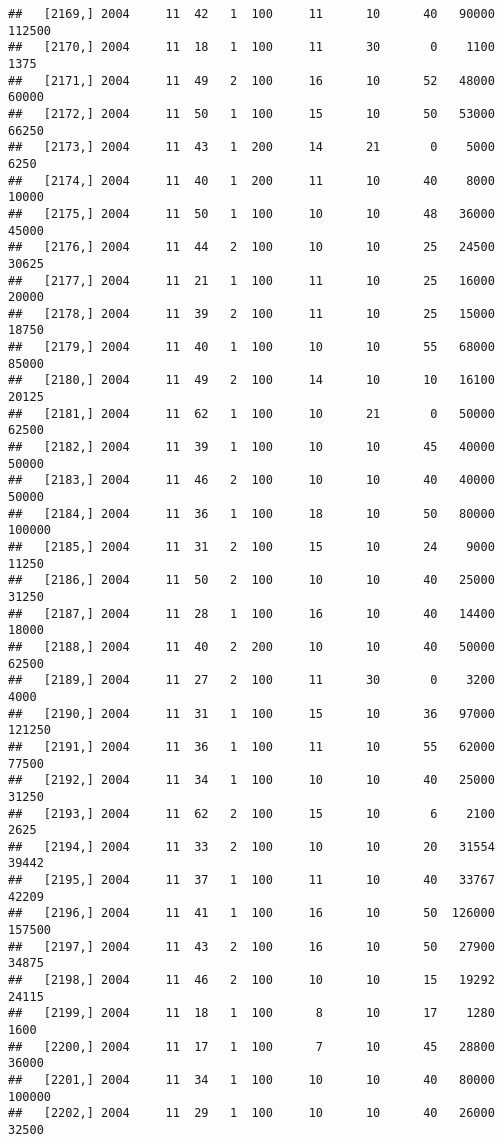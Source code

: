 \documentclass{article}\usepackage[]{graphicx}\usepackage[]{color}
\makeatletter
\newenvironment{kframe}{%
 \def\at@end@of@kframe{}%
 \ifinner\ifhmode%
  \def\at@end@of@kframe{\end{minipage}}%
  \begin{minipage}{\columnwidth}%
 \fi\fi%
 \def\FrameCommand##1{\hskip\@totalleftmargin \hskip-\fboxsep
 \colorbox{shadecolor}{##1}\hskip-\fboxsep
     \hskip-\linewidth \hskip-\@totalleftmargin \hskip\columnwidth}%
 \MakeFramed {\advance\hsize-\width
   \@totalleftmargin\z@ \linewidth\hsize
   \@setminipage}}%
 {\par\unskip\endMakeFramed%
 \at@end@of@kframe}
\newenvironment{knitrout}{}{} %
\makeatother
\begin{document}
\begin{knitrout}
\begin{kframe}
\begin{verbatim}
##   [2169,] 2004     11  42   1  100     11      10      40   90000  112500
##   [2170,] 2004     11  18   1  100     11      30       0    1100    1375
##   [2171,] 2004     11  49   2  100     16      10      52   48000   60000
##   [2172,] 2004     11  50   1  100     15      10      50   53000   66250
##   [2173,] 2004     11  43   1  200     14      21       0    5000    6250
##   [2174,] 2004     11  40   1  200     11      10      40    8000   10000
##   [2175,] 2004     11  50   1  100     10      10      48   36000   45000
##   [2176,] 2004     11  44   2  100     10      10      25   24500   30625
##   [2177,] 2004     11  21   1  100     11      10      25   16000   20000
##   [2178,] 2004     11  39   2  100     11      10      25   15000   18750
##   [2179,] 2004     11  40   1  100     10      10      55   68000   85000
##   [2180,] 2004     11  49   2  100     14      10      10   16100   20125
##   [2181,] 2004     11  62   1  100     10      21       0   50000   62500
##   [2182,] 2004     11  39   1  100     10      10      45   40000   50000
##   [2183,] 2004     11  46   2  100     10      10      40   40000   50000
##   [2184,] 2004     11  36   1  100     18      10      50   80000  100000
##   [2185,] 2004     11  31   2  100     15      10      24    9000   11250
##   [2186,] 2004     11  50   2  100     10      10      40   25000   31250
##   [2187,] 2004     11  28   1  100     16      10      40   14400   18000
##   [2188,] 2004     11  40   2  200     10      10      40   50000   62500
##   [2189,] 2004     11  27   2  100     11      30       0    3200    4000
##   [2190,] 2004     11  31   1  100     15      10      36   97000  121250
##   [2191,] 2004     11  36   1  100     11      10      55   62000   77500
##   [2192,] 2004     11  34   1  100     10      10      40   25000   31250
##   [2193,] 2004     11  62   2  100     15      10       6    2100    2625
##   [2194,] 2004     11  33   2  100     10      10      20   31554   39442
##   [2195,] 2004     11  37   1  100     11      10      40   33767   42209
##   [2196,] 2004     11  41   1  100     16      10      50  126000  157500
##   [2197,] 2004     11  43   2  100     16      10      50   27900   34875
##   [2198,] 2004     11  46   2  100     10      10      15   19292   24115
##   [2199,] 2004     11  18   1  100      8      10      17    1280    1600
##   [2200,] 2004     11  17   1  100      7      10      45   28800   36000
##   [2201,] 2004     11  34   1  100     10      10      40   80000  100000
##   [2202,] 2004     11  29   1  100     10      10      40   26000   32500

\end{verbatim}
\end{kframe}
\end{knitrout}
\end{document}
